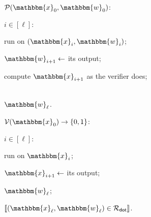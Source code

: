 \documentclass[../../book.tex]{subfiles}
\begin{document}
\begin{algoproto}[H]
    \small
    \centering
    \begin{mdframed}[linecolor=black, linewidth=1pt,
                     skipabove=10pt, skipbelow=10pt,
                     innerleftmargin=5pt, innerrightmargin=5pt]
        \begin{minipage}[t]{0.48\linewidth}
            \colorbox{oc-blue-1}{$\mathcal{P}(\mathbbm{x}_0, \mathbbm{w}_0)$:}
            \begin{algoen}
                \item {} $i \in [\ell]$:
                \item \hspace{5px} run  on $(\mathbbm{x}_{i}, \mathbbm{w}_{i})$;
                \item \hspace{5px} $\mathbbm{w}_{i+1} \gets$ its output;
                \item \hspace{5px} compute $\mathbbm{x}_{i+1}$ as the verifier does;
                \item {} \\  $\mathbbm{w}_{\ell}$.
            \end{algoen}
        \end{minipage}
        \hfill
        \begin{minipage}[t]{0.48\linewidth}
            \colorbox{oc-blue-1}{$\mathcal{V}(\mathbbm{x}_0) \to \{0,1\}$:}
            \begin{algoen}
                \item {} $i \in [\ell]$:
                \item \hspace{5px} run  on $\mathbbm{x}_{i}$;
                \item \hspace{5px} $\mathbbm{x}_{i+1} \gets$ its output;
                \item {} $\mathbbm{w}_{\ell}$;
                \item {} $\llbracket (\mathbbm{x}_{\ell}, \mathbbm{w}_{\ell}) \in \mathcal{R}_{\mathsf{dot}} \rrbracket$.
            \end{algoen}
        \end{minipage}
    \end{mdframed}
    \caption{The recursive LaBRADOR protocol with $\ell$ iterations. If any check inside an iteration fails, the verifier rejects. The proof consists of the short messages $\pi$ of all iterations and the final witness $\mathbbm{w}_{\ell}$.}
    \label{fig:labrador-recursive}
\end{algoproto}
\end{document}
